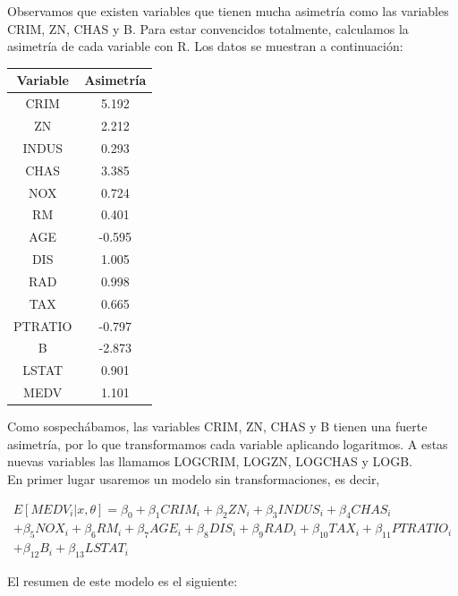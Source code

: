 \documentclass[12pt,a4paper,twoside,openright,titlepage,final]{article}
\begin{document}
Observamos que existen variables que tienen mucha asimetría como las variables CRIM, ZN, CHAS y B. Para estar convencidos totalmente, calculamos la asimetría de cada variable con R. Los datos se muestran a continuación:

\begin{table}[htbp!]
\centering
\begin{tabular}{@{}cc@{}}
\toprule
Variable & Asimetría \\ \midrule
CRIM     & 5.192     \\ \midrule
ZN       & 2.212     \\ \midrule
INDUS    & 0.293     \\ \midrule
CHAS     & 3.385     \\ \midrule
NOX      & 0.724     \\ \midrule
RM       & 0.401     \\ \midrule
AGE      & -0.595    \\ \midrule
DIS      & 1.005     \\ \midrule
RAD      & 0.998     \\ \midrule
TAX      & 0.665     \\ \midrule
PTRATIO  & -0.797    \\ \midrule
B        & -2.873    \\ \midrule
LSTAT    & 0.901     \\ \midrule
MEDV     & 1.101     \\ \bottomrule
\end{tabular}
\end{table}

Como sospechábamos, las variables CRIM, ZN, CHAS y B tienen una fuerte asimetría, por lo que transformamos cada variable aplicando logaritmos. A estas nuevas variables las llamamos LOGCRIM, LOGZN, LOGCHAS y LOGB.\\

En primer lugar usaremos un modelo sin transformaciones, es decir,

\begin{multline*}
E[MEDV_i |x, \theta] = \beta_0 + \beta_1 CRIM_i + \beta_2 ZN_i + \beta_3 INDUS_i + \beta_4 CHAS_i \\ + \beta_5 NOX_i + \beta_6 RM_i + \beta_7 AGE_i + \beta_8 DIS_i + \beta_9 RAD_i + \beta_{10} TAX_i + \beta_{11} PTRATIO_i \\ + \beta_{12} B_i + \beta_{13} LSTAT_i
\end{multline*}

El resumen de este modelo es el siguiente:
\end{document}
